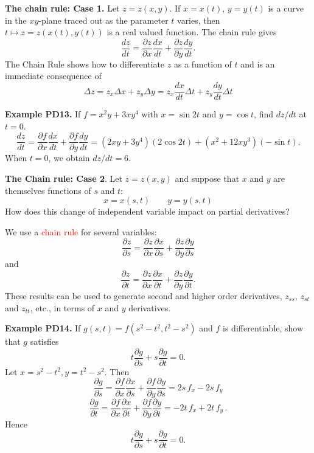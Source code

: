 \documentclass{article}
\begin{document}
\textbf{The chain rule: Case 1.}
Let $z=z(x,y)$. If $x=x(t)$, $y=y(t)$ is a curve in the $xy$-plane
traced out as the parameter $t$ varies, then $t \mapsto z=z(x(t), y(t))$ is a real valued function.
The chain rule gives
$$
\frac{dz}{dt} = \frac{\partial z}{\partial x} \frac{dx}{dt} + \frac{\partial z}{\partial y}\frac{dy}{dt}.
$$
The Chain Rule shows how to differentiate $z$ as a function of $t$ and is an immediate consequence of
$$
\Delta z = z_x \Delta x + z_y \Delta y = z_x \frac{dx}{dt} \Delta t + z_y \frac{dy}{dt} \Delta t
$$



\textbf{Example PD13.} If $f=x^2 y+ 3x y^4$ with $ x=\sin 2 t$ and $y= \cos t$,  find $dz/dt$ at $t=0$.
$$
\frac{dz}{dt} = \frac{\partial f}{\partial x} \frac{dx}{dt} +
\frac{\partial f}{\partial y}\frac{dy}{dt} = ( 2xy+ 3y^4)( 2 \cos
2t)+ (x^2+12 xy^3)(-\sin t).
$$
When $t=0$, we obtain $ dz/dt =6$.



\textbf{The Chain rule: Case 2}. Let $z=z(x,y)$ and suppose that
$x$ and $y$ are themselves functions of $s$ and $t$:
$$
x = x(s,t)\qquad y=y(s,t)
$$
How does this change of independent variable impact on partial derivatives?

We use a \textcolor{red}{chain rule} for several variables:
$$
\frac{\partial z}{\partial s} =
 \frac{\partial z}{\partial x} \frac{\partial x}{\partial s}
+ \frac{\partial z}{\partial y} \frac{\partial y}{\partial s}
$$
and
$$ \frac{\partial z}{\partial t} =
 \frac{\partial z}{\partial x} \frac{\partial x}{\partial t}
+ \frac{\partial z}{\partial y} \frac{\partial y}{\partial t}.
$$
These results can be used to generate second and higher order
derivatives, $z_{ss}$, $z_{st}$ and $z_{tt}$, etc., in terms of $x$ and
$y$ derivatives.



\textbf{Example PD14.} If $g(s, t)=f(s^2-t^2, t^2-s^2)$ and $f$ is
differentiable, show that $g$ satisfies
$$
t\frac{\partial g}{\partial s} + s \frac{\partial g}{\partial t}
=0.
$$
Let $ x=s^2-t^2, y=t^2-s^2$. Then
$$
\frac{\partial g}{\partial s} =
 \frac{\partial f}{\partial x} \frac{\partial x}{\partial s}
+ \frac{\partial f}{\partial y} \frac{\partial y}{\partial s}=2s\, f_x - 2s \, f_y
$$
$$
\frac{\partial g}{\partial t} =
 \frac{\partial f}{\partial x} \frac{\partial x}{\partial t}
+ \frac{\partial f}{\partial y} \frac{\partial y}{\partial t}=-2t \, f_x +2t \, f_y\,.
$$
Hence
$$
t\frac{\partial g}{\partial s} + s \frac{\partial g}{\partial t}
=0.
$$
\end{document}
